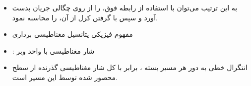 \begin{ELunit}

\begin{itemize}
\tightlist
\item
  به این ترتیب می‌توان با استفاده از رابطه فوق،  را از روی چگالی جریان بدست آورد و سپس با گرفتن کرل از آن،  را محاسبه نمود.
\item
  مفهوم فیزیکی پتانسیل مغناطیسی برداری
\end{itemize}


\end{ELunit}

\begin{ELjoin}

\begin{itemize}
\tightlist
\item
  \ELim{\Phi}: شار مغناطیسی با واحد وبر
\end{itemize}

\begin{ELimportant}{}


\end{ELimportant}

\end{ELjoin}

\begin{ELunit}

\begin{itemize}
\tightlist
\item
  انتگرال خطی  به دور هر مسیر بسته ، برابر با کل شار مغناطیسی گذرنده از سطح محصور شده توسط این مسیر است.
\end{itemize}

\end{ELunit}

\ELhold


